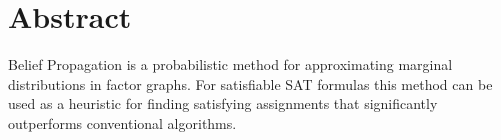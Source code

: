 \begingroup
\let\clearpage\relax
\let\cleardoublepage\relax
\let\cleardoublepage\relax

\chapter*{Abstract}
Belief Propagation is a probabilistic method for approximating marginal distributions in factor graphs. For satisfiable SAT formulas this method can be used as a heuristic for finding satisfying assignments that significantly outperforms conventional algorithms.
\begin{center}
\end{center}

\vfill

\endgroup

\vfill
